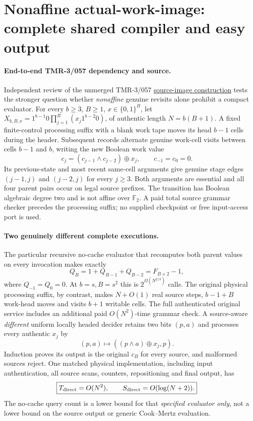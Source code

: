 \documentclass[11pt]{article}
\begin{document}
\section{Nonaffine actual-work-image: complete shared compiler and easy output}
\paragraph{End-to-end TMR-3/057 dependency and source.}
Independent review of the unmerged TMR-3/057
\href{https://github.com/j15marti/pnp/pull/180}{source-image
construction} tests the stronger question whether
\emph{nonaffine} genuine revisits alone prohibit a compact evaluator.
For every $b\ge3$, $B\ge1$, $x\in\{0,1\}^B$,
let $X_{b,B,x}=1^{b-1}0\prod_{j=1}^B(x_j1^{b-2}0)$,
of authentic length $N=b(B+1)$. A fixed finite-control
processing suffix with a blank work tape moves its head
$b-1$ cells during the header. Subsequent records
alternate genuine work-cell visits between cells $b-1$
and $b$, writing the new Boolean work value
\[
c_j=(c_{j-1}\wedge c_{j-2})\oplus x_j,\qquad
c_{-1}=c_0=0.
\]
Its previous-state and most recent same-cell
arguments give genuine stage edges $(j-1,j)$ and
$(j-2,j)$ for every $j\ge3$. Both arguments are
essential and all four parent pairs occur on legal
source prefixes. The transition has Boolean algebraic
degree two and is not affine over $\mathbb F_2$.
A paid total source grammar checker precedes the
processing suffix; no supplied checkpoint or
free input-access port is used.

\paragraph{Two genuinely different complete executions.}
The particular recursive no-cache evaluator that
recomputes both parent values on every invocation
makes exactly
\[
Q_B=1+Q_{B-1}+Q_{B-2}=F_{B+2}-1,
\]
where $Q_{-1}=Q_0=0$. At $b=s,B=s^2$ this
is $2^{\Omega(N^{2/3})}$ calls. The original
physical processing suffix, by contrast, makes
$N+O(1)$ real source steps, $b-1+B$ work-head
moves and visits $b+1$ writable cells. The full
authenticated original service includes an additional
paid $O(N^2)$-time grammar check.
A source-aware \emph{different} uniform
locally headed decider retains two bits $(p,a)$
and processes every authentic $x_j$ by
\[
(p,a)\longmapsto ((p\wedge a)\oplus x_j,p).
\]
Induction proves its output is the original $c_B$
for every source, and malformed sources reject.
One matched physical implementation, including
input authentication, all source scans, counters,
repositioning and final output, has
\[
\boxed{T_{\rm direct}=O(N^2),\qquad
S_{\rm direct}=O(\log(N+2)).}
\]
The no-cache query count is a lower bound for that
\emph{specified evaluator only}, not a lower bound on
the source output or generic Cook--Mertz evaluation.
\end{document}
